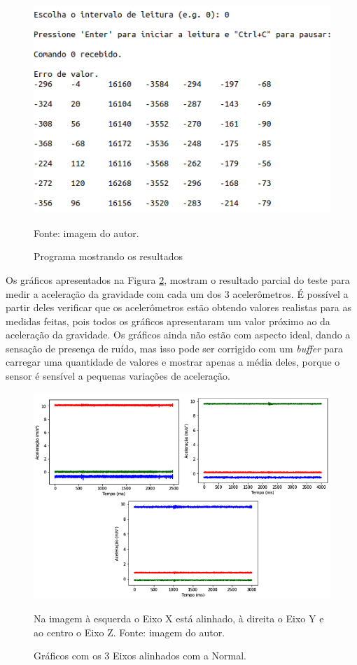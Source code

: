 	\begin{figure}[h]
		\centering
		\includegraphics[keepaspectratio=true,scale=0.5]{figuras/programa_rodando.png}
		\caption{Programa mostrando os resultados}
		Fonte: imagem do autor. 
		\label{rodando}	
	\end{figure}
	
		
	Os gráficos apresentados na Figura \ref{acelx_0}, mostram o resultado parcial do teste para medir a aceleração da gravidade com cada um dos 3 acelerômetros. É possível a partir deles verificar que os acelerômetros estão obtendo valores realistas para as medidas feitas, pois todos os gráficos apresentaram um valor próximo ao da aceleração da gravidade. Os gráficos ainda não estão com aspecto ideal, dando a sensação de presença de ruído, mas isso pode ser corrigido com um \textit{buffer} para carregar uma quantidade de valores e mostrar apenas a média deles, porque o sensor é sensível a pequenas variações de aceleração.   
	
	\begin{figure}[h]
		\centering
		\includegraphics[keepaspectratio=true,scale=0.6]{figuras/graficos_acel.png}
		\caption{Gráficos com os 3 Eixos alinhados com a Normal.}
		Na imagem à esquerda o Eixo X está alinhado, à direita o Eixo Y e ao centro o Eixo Z. \footnotesize
		Fonte: imagem do autor. 
		\label{acelx_0}	
	\end{figure}		
	
